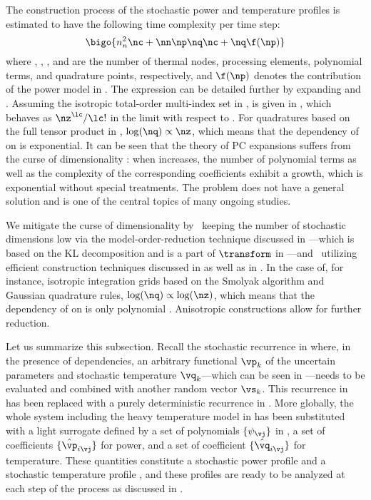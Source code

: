 The construction process of the stochastic power and temperature profiles is
estimated to have the following time complexity per time step:
\[
  \bigo{n_n^2 \nc + \nn \np \nq \nc + \nq \f(\np)}
\]
where \nn, \np, \nc, and \nq are the number of thermal nodes, processing
elements, polynomial terms, and quadrature points, respectively, and $\f(\np)$
denotes the contribution of the power model in . The
expression can be detailed further by expanding \nc and \nq. Assuming the
isotropic total-order multi-index set in , \nc
is given in , which behaves as $\nz^\lc
/ \lc!$ in the limit with respect to \nz. For quadratures based on the full
tensor product in , $\log(\nq) \propto \nz$, which
means that the dependency of \nq on \nz is exponential. It can be seen that the
theory of \ac{PC} expansions suffers from the curse of dimensionality
\cite{eldred2008, xiu2010}: when \nz increases, the number of polynomial terms
as well as the complexity of the corresponding coefficients exhibit a growth,
which is exponential without special treatments. The problem does not have a
general solution and is one of the central topics of many ongoing studies.

We mitigate the curse of dimensionality by \one~keeping the number of stochastic
dimensions low via the model-order-reduction technique discussed in
---which is based on the \ac{KL} decomposition
and is a part of $\transform$ in ---and
\two~utilizing efficient construction techniques discussed in
 as well as in . In
the case of, for instance, isotropic integration grids based on the Smolyak
algorithm and Gaussian quadrature rules, $\log(\nq) \propto \log(\nz)$, which
means that the dependency of \nq on \nz is only polynomial \cite{heiss2008}.
Anisotropic constructions allow for further reduction.

Let us summarize this subsection. Recall the stochastic recurrence in
 where, in the presence of dependencies, an
arbitrary functional $\vp_k$ of the uncertain parameters \vu and stochastic
temperature $\vq_k$---which can be seen in ---needs to
be evaluated and combined with another random vector $\vs_k$. This recurrence in
 has been replaced with a purely deterministic
recurrence in . More globally, the whole system including
the heavy temperature model in  has been
substituted with a light surrogate defined by a set of polynomials $\{
\psi_{\vj} \}$ in \vz, a set of coefficients $\{ \hat{\vp}_{i \vj} \}$ for
power, and a set of coefficient $\{ \hat{\vq}_{i \vj} \}$ for temperature. These
quantities constitute a stochastic power profile \mp and a stochastic
temperature profile \mq, and these profiles are ready to be analyzed at each
step of the process as discussed in .

